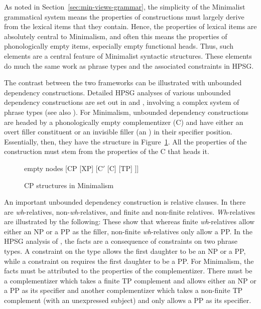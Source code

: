 \documentclass[output=paper,biblatex,babelshorthands,newtxmath,draftmode,colorlinks,citecolor=brown]{langscibook}
\begin{document}
As noted in Section~\ref{sec:min-views-grammar}, the simplicity of the Minimalist grammatical system
means the properties of constructions must largely derive from the lexical items that they
contain. Hence, the properties of lexical items are absolutely central to Minimalism, and often this
means the properties of phonologically empty items, especially empty functional
heads. Thus, such elements are a central feature of Minimalist syntactic
structures. These elements do much the same work as phrase types and the associated constraints in HPSG. 

\largerpage
The contrast between the two frameworks can be illustrated with unbounded dependency
constructions. Detailed HPSG analyses of various unbounded dependency constructions are set out in
\citet{Sag97a,Sag2010b} and \citet{GSag2000a-u}, involving a complex system of phrase types (see
also ). For
Minimalism, unbounded dependency constructions are headed by a phonologically empty complementizer
(C) and have either an overt filler constituent or an invisible filler (an ) in their
specifier position. Essentially, then, they have the structure in Figure~\ref{fig:min-CP}.
All the properties of the construction must stem from the properties of the C that heads it. 
\begin{figure}
	\centering
	\begin{forest} %
		empty nodes
		[CP
		[XP]
		[C$'$ [C] [TP]
		]]
	\end{forest}
	\caption{\label{fig:min-CP}CP structures in Minimalism}
\end{figure}

An important unbounded dependency construction is relative clauses. In  there are \emph{wh}-relatives, non-\emph{wh}-relatives, and finite and non-finite relatives. \emph{Wh}-relatives are illustrated by the following:
\eal
{}\label{ex:min-someone-who-can}
\label{ex:min-someone-on-whom-can}
\zl 
\eal
{}\label{ex:min-someone-who-to}
\label{ex:min-someone-whom-to}
\zl 
These show that whereas finite \emph{wh}-relatives allow either an NP or a PP as the filler,
non-finite \emph{wh}-relatives only allow a PP. In the HPSG analysis of \citet{Sag97a}, the facts
are a consequence of constraints on two phrase types. A constraint on the type
 allows the first daughter to be an
NP or a PP, while a constraint on 
requires the first daughter to be a PP. For Minimalism, the facts must be attributed to the
properties of the complementizer. There must be a complementizer which takes a finite TP complement
and allows either an NP or a PP as its specifier and another complementizer which takes a non-finite
TP complement (with an unexpressed subject) and only allows a PP as its specifier. 
\end{document}

